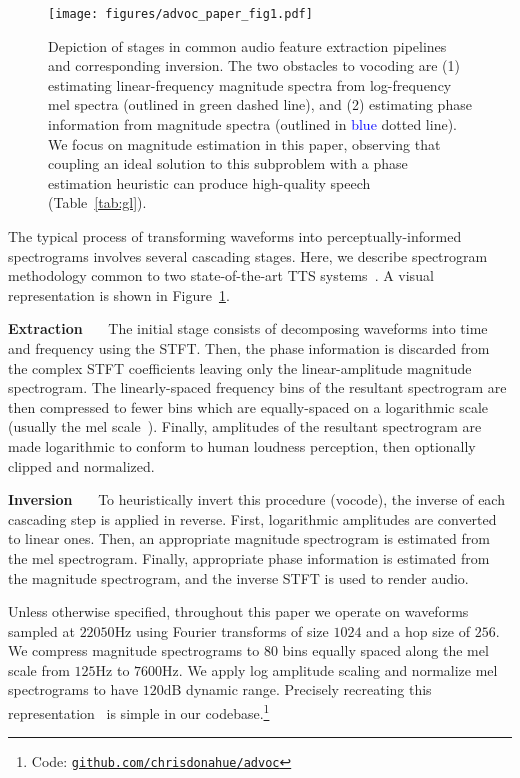 \documentclass[a4paper]{article}
\newcommand{\coollink}[1]{\href{https://#1}{\nolinkurl{#1}}}
\begin{document}
\label{sec:feature}
\begin{figure}[t]
    \centering
    \texttt{[image: figures/advoc\_paper\_fig1.pdf]}
    \caption{
    Depiction of stages in common audio feature extraction pipelines and corresponding inversion. 
    The two obstacles to vocoding are (1) estimating linear-frequency magnitude spectra from log-frequency mel spectra (outlined in \textcolor[rgb]{0.29, 0.33, 0.13}{green} dashed line), and (2) estimating phase information from magnitude spectra (outlined in \textcolor{blue}{blue} dotted line).
    We focus on magnitude estimation in this paper, observing that coupling an ideal solution to this subproblem with a phase estimation heuristic can produce high-quality speech (Table~\ref{tab:gl}).}
    \label{fig:extract_invert}
\end{figure}

The typical process of transforming waveforms into perceptually-informed spectrograms involves several cascading stages.
Here, we describe spectrogram methodology common to two state-of-the-art TTS systems~\cite{ping2017deep,shen2018natural}. A visual representation is shown in Figure~\ref{fig:extract_invert}.

\textbf{Extraction}~~~
The initial stage consists of decomposing waveforms into time and frequency using the STFT. Then,
the phase information is discarded from the complex STFT coefficients leaving only the linear-amplitude magnitude spectrogram. 
The linearly-spaced frequency bins of the resultant spectrogram are then compressed to fewer bins which are equally-spaced on a logarithmic scale (usually the mel scale~\cite{stevens1937scale}). 
Finally, amplitudes of the resultant spectrogram are made logarithmic to conform to human loudness perception, then optionally clipped and normalized.

\textbf{Inversion}~~~
To heuristically invert this procedure (vocode), 
the inverse of each cascading step is applied in reverse.
First, logarithmic amplitudes are converted to linear ones. 
Then,  
an appropriate magnitude spectrogram is estimated from the mel spectrogram.
Finally, appropriate phase information is estimated from the magnitude spectrogram, and the inverse STFT is used to render audio.

Unless otherwise specified, throughout this paper we operate on waveforms sampled at $22050$Hz using Fourier transforms of size $1024$ and a hop size of $256$. 
We compress magnitude spectrograms to $80$ bins equally spaced along the mel scale from $125$Hz to $7600$Hz.
We apply log amplitude scaling and normalize mel spectrograms to have $120$dB dynamic range. 
Precisely recreating this representation~\cite{mcfee2019open} is simple in our codebase.\footnote{Code: \coollink{github.com/chrisdonahue/advoc}}
\end{document}
